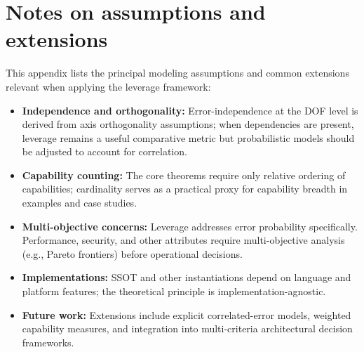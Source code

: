 \section{Notes on assumptions and extensions}\label{appendix-assumptions}

This appendix lists the principal modeling assumptions and common extensions relevant when applying the leverage framework:

\begin{itemize}
	\item \textbf{Independence and orthogonality:} Error-independence at the DOF level is derived from axis orthogonality assumptions; when dependencies are present, leverage remains a useful comparative metric but probabilistic models should be adjusted to account for correlation.
	\item \textbf{Capability counting:} The core theorems require only relative ordering of capabilities; cardinality serves as a practical proxy for capability breadth in examples and case studies.
	\item \textbf{Multi-objective concerns:} Leverage addresses error probability specifically. Performance, security, and other attributes require multi-objective analysis (e.g., Pareto frontiers) before operational decisions.
	\item \textbf{Implementations:} SSOT and other instantiations depend on language and platform features; the theoretical principle is implementation-agnostic.
	\item \textbf{Future work:} Extensions include explicit correlated-error models, weighted capability measures, and integration into multi-criteria architectural decision frameworks.
\end{itemize}

